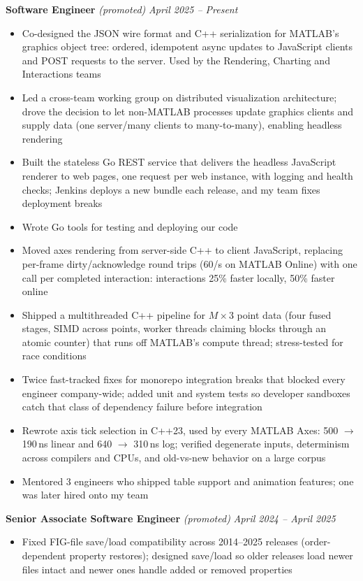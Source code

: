 \documentclass{article}
\begin{document}
{\large \textbf{Software Engineer}} \textit{(promoted)} \hfill \textit{April 2025 -- Present}
\begin{itemize}[leftmargin=*]
    \item Co-designed the JSON wire format and C++ serialization for MATLAB's graphics object tree: ordered, idempotent async updates to JavaScript clients and POST requests to the server. Used by the Rendering, Charting and Interactions teams
    \item Led a cross-team working group on distributed visualization architecture; drove the decision to let non-MATLAB processes update graphics clients and supply data (one server\slash many clients to many-to-many), enabling headless rendering
    \item Built the stateless Go REST service that delivers the headless JavaScript renderer to web pages, one request per web instance, with logging and health checks; Jenkins deploys a new bundle each release, and my team fixes deployment breaks
    \item Wrote Go tools for testing and deploying our code
    \item Moved axes rendering from server-side C++ to client JavaScript, replacing per-frame dirty/acknowledge round trips (60/s on MATLAB Online) with one call per completed interaction: interactions 25\% faster locally, 50\% faster online
    \item Shipped a multithreaded C++ pipeline for $M \times 3$ point data (four fused stages, SIMD across points, worker threads claiming blocks through an atomic counter) that runs off MATLAB's compute thread; stress-tested for race conditions
    \item Twice fast-tracked fixes for monorepo integration breaks that blocked every engineer company-wide; added unit and system tests so developer sandboxes catch that class of dependency failure before integration
    \item Rewrote axis tick selection in C++23, used by every MATLAB Axes: 500 $\to$ 190\,ns linear and 640 $\to$ 310\,ns log; verified degenerate inputs, determinism across compilers and CPUs, and old-vs-new behavior on a large corpus
    \item Mentored 3 engineers who shipped table support and animation features; one was later hired onto my team
\end{itemize}

{\large \textbf{Senior Associate Software Engineer}} \textit{(promoted)} \hfill \textit{April 2024 -- April 2025}
\begin{itemize}[leftmargin=*]
    \item Fixed FIG-file save/load compatibility across 2014--2025 releases (order-dependent property restores); designed save/load so older releases load newer files intact and newer ones handle added or removed properties
\end{itemize}
\end{document}
